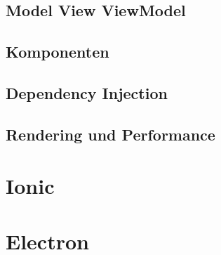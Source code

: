 \subsection{Model View ViewModel}
\subsection{Komponenten}
\subsection{Dependency Injection}
\subsection{Rendering und Performance}


\section{Ionic}
\section{Electron}
